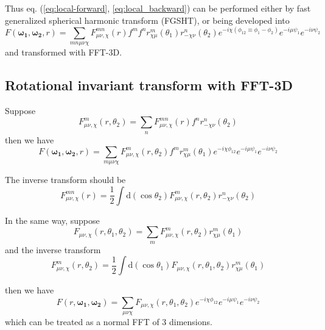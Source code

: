 Thus eq. (\ref{eq:local-forward}, \ref{eq:local_backward}) can be
performed either by fast generalized spherical harmonic transform
(FGSHT), or being developed into
\begin{equation}
F(\boldsymbol{\omega_{1}},\boldsymbol{\omega_{2}},r)=\sum_{mn\mu\nu\chi}F_{\mu\nu,\chi}^{mn}(r)f^{m}f^{n}r_{\chi\mu}^{m}(\theta_{1})r_{-\chi\nu}^{n}(\theta_{2})e^{-i\chi(\phi_{12}\equiv\phi_{1}-\phi_{2})}e^{-i\mu\psi_{1}}e^{-i\nu\psi_{2}}\label{eq:eq_s1_local}
\end{equation}
and transformed with FFT-3D.

\subsection{Rotational invariant transform with FFT-3D}

Suppose
\begin{equation}
F_{\mu\nu,\chi}^{m}(r,\theta_{2})=\sum_{n}F_{\mu\nu,\chi}^{mn}(r)f^{n}r_{-\chi\nu}^{n}(\theta_{2})
\end{equation}
then we have
\begin{equation}
F(\boldsymbol{\omega_{1}},\boldsymbol{\omega_{2}},r)=\sum_{m\mu\nu\chi}F_{\mu\nu,\chi}^{m}(r,\theta_{2})f^{m}r_{\chi\mu}^{m}(\theta_{1})e^{-i\chi\phi_{12}}e^{-i\mu\psi_{1}}e^{-i\nu\psi_{2}}
\end{equation}

The inverse transform should be
\begin{equation}
F_{\mu\nu,\chi}^{mn}(r)=\frac{1}{2}\int\mathrm{d}(\cos\theta_{2})F_{\mu\nu,\chi}^{m}(r,\theta_{2})r_{-\chi\nu}^{n}(\theta_{2})
\end{equation}

In the same way, suppose
\begin{equation}
F_{\mu\nu,\chi}(r,\theta_{1},\theta_{2})=\sum_{m}F_{\mu\nu,\chi}^{m}(r,\theta_{2})r_{\chi\mu}^{m}(\theta_{1})
\end{equation}
and the inverse transform
\begin{equation}
F_{\mu\nu,\chi}^{m}(r,\theta_{2})=\frac{1}{2}\int\mathrm{d}(\cos\theta_{1})F_{\mu\nu,\chi}(r,\theta_{1},\theta_{2})r_{\chi\mu}^{m}(\theta_{1})
\end{equation}

then we have
\begin{equation}
F(r,\boldsymbol{\omega_{1}},\boldsymbol{\omega_{2}})=\sum_{\mu\nu\chi}F_{\mu\nu,\chi}(r,\theta_{1},\theta_{2})e^{-i\chi\phi_{12}}e^{-i\mu\psi_{1}}e^{-i\nu\psi_{2}}\label{eq:eq_s3_local}
\end{equation}
which can be treated as a normal FFT of 3 dimensions.

